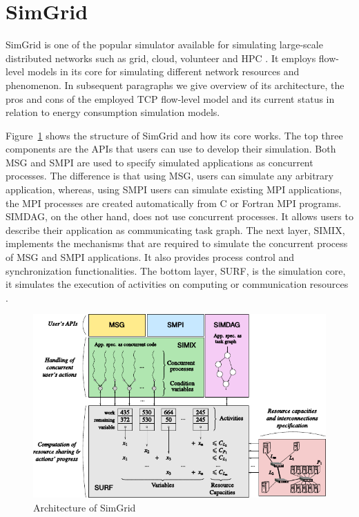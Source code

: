 \section{SimGrid}
\label{section:simgrid} 
SimGrid is one of the popular simulator available for simulating large-scale distributed networks such as grid, cloud, volunteer and HPC \cite{simgrid}. It employs flow-level models in its core for simulating different network resources and phenomenon. In subsequent paragraphs we give overview of its architecture, the pros and cons of the employed TCP flow-level model and its current status in relation to energy consumption simulation models.

Figure~\ref{fig:SimGrid} shows the structure of SimGrid and how its core works. The top three components are the APIs that users can use to develop their simulation. Both MSG and SMPI are used to specify simulated applications as concurrent processes. The difference is that using MSG, users can simulate any arbitrary application, whereas, using SMPI users can simulate existing MPI applications, the MPI processes are created automatically from C or Fortran MPI programs. SIMDAG, on the other hand, does not use concurrent processes. It allows users to describe their application as communicating task graph. The next layer, SIMIX, implements the mechanisms that are required to simulate the concurrent process of MSG and SMPI applications. It also provides process control and synchronization functionalities. The bottom layer, SURF, is the simulation core, it simulates the execution of activities on computing or communication resources \cite{DBLP:journals/jpdc/CasanovaGLQS14}.
\begin{figure}[ht]
	\begin{center}
		\includegraphics{images/SimGrid.pdf}
		\caption{Architecture of SimGrid \cite{DBLP:journals/jpdc/CasanovaGLQS14}}
		\label{fig:SimGrid}
	\end{center}
\end{figure}
